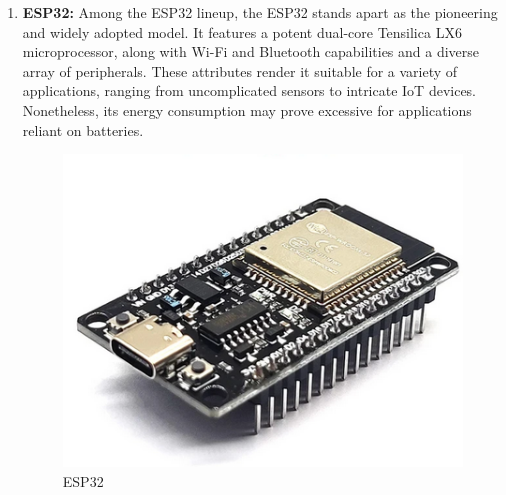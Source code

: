 \documentclass[11pt]{article}
\begin{document}
\begin{enumerate}
    \item \textbf{ESP32:} Among the ESP32 lineup, the ESP32 stands apart as the pioneering and widely adopted model. It features a potent dual-core Tensilica LX6 microprocessor, along with Wi-Fi and Bluetooth capabilities and a diverse array of peripherals. These attributes render it suitable for a variety of applications, ranging from uncomplicated sensors to intricate IoT devices. Nonetheless, its energy consumption may prove excessive for applications reliant on batteries.
    \begin{figure}[ht]
        \centering
        \includegraphics[scale = 0.18]{ESP32.png}
        \caption{ESP32}
        \label{fig:ESP32}
    \end{figure}
    

\end{enumerate}
\end{document}
